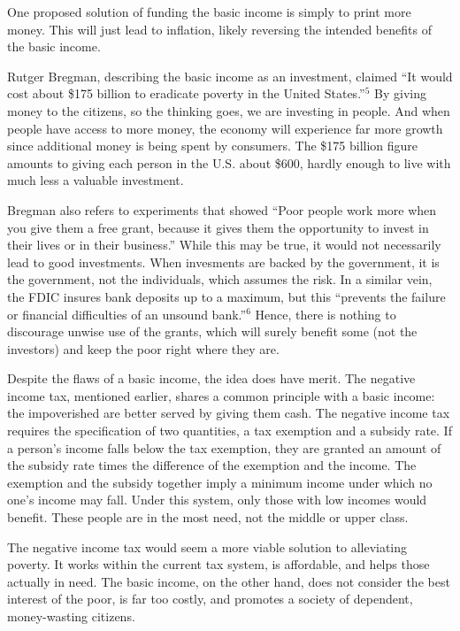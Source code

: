 \documentclass[12pt]{article}
\begin{document}
One proposed solution of funding the basic income is simply to print more money. This will just lead to inflation, likely reversing the intended benefits of the basic income.

Rutger Bregman, describing the basic income as an investment, claimed ``It would cost about \$175 billion to eradicate poverty in the United States.''$^5$ By giving money to the citizens, so the thinking goes, we are investing in people. And when people have access to more money, the economy will experience far more growth since additional money is being spent by consumers. The \$175 billion figure amounts to giving each person in the U.S. about \$600, hardly enough to live with much less a valuable investment.

Bregman also refers to experiments that showed ``Poor people work more when you give them a free grant, because it gives them the opportunity to invest in their lives or in their business.'' While this may be true, it would not necessarily lead to good investments. When invesments are backed by the government, it is the government, not the individuals, which assumes the risk. In a similar vein, the FDIC insures bank deposits up to a maximum, but this ``prevents the failure or financial difficulties of an unsound bank.''$^6$ Hence, there is nothing to discourage unwise use of the grants, which will surely benefit some (not the investors) and keep the poor right where they are.

Despite the flaws of a basic income, the idea does have merit. The negative income tax, mentioned earlier, shares a common principle with a basic income: the impoverished are better served by giving them cash. The negative income tax requires the specification of two quantities, a tax exemption and a subsidy rate. If a person's income falls below the tax exemption, they are granted an amount of the subsidy rate times the difference of the exemption and the income. The exemption and the subsidy together imply a minimum income under which no one's income may fall. Under this system, only those with low incomes would benefit. These people are in the most need, not the middle or upper class.

The negative income tax would seem a more viable solution to alleviating poverty. It works within the current tax system, is affordable, and helps those actually in need. The basic income, on the other hand, does not consider the best interest of the poor, is far too costly, and promotes a society of dependent, money-wasting citizens.
\bigskip
\end{document}
